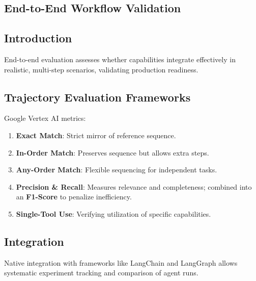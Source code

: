\begin{TNtwocol}
\section{End-to-End Workflow Validation }
\subsection{Introduction}
End-to-end evaluation assesses whether capabilities integrate effectively in realistic, multi-step scenarios, validating production readiness.

\subsection{Trajectory Evaluation Frameworks}
Google Vertex AI metrics:
\begin{enumerate}
    \item \textbf{Exact Match}: Strict mirror of reference sequence.
    \item \textbf{In-Order Match}: Preserves sequence but allows extra steps.
    \item \textbf{Any-Order Match}: Flexible sequencing for independent tasks.
    \item \textbf{Precision \& Recall}: Measures relevance and completeness; combined into an \textbf{F1-Score} to penalize inefficiency.
    \item \textbf{Single-Tool Use}: Verifying utilization of specific capabilities.
\end{enumerate}

\subsection{Integration}
Native integration with frameworks like LangChain and LangGraph allows systematic experiment tracking and comparison of agent runs.
\end{TNtwocol}

